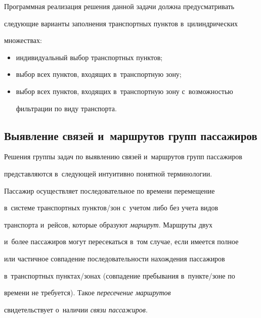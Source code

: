 Программная реализация решения данной задачи должна предусмат\-ри\-вать 


сле\-ду\-ющие варианты заполнения транспортных пунк\-тов в~ци\-линд\-ри\-че\-ских 


множествах:


\begin{itemize}


\item индивидуальный выбор транспортных пунктов;


\item выбор всех пунктов, входящих в~транспортную зону;


\item выбор всех пунктов, входящих в~транспортную зону с~воз\-мож\-ностью 


фильт\-ра\-ции по виду транспорта.


\end{itemize}





\subsection{Выявление связей и~маршрутов групп пассажиров} %





Решения группы задач по выявлению связей и~маршрутов групп пассажиров 


представляются в~сле\-ду\-ющей интуитивно понятной терминологии. 


Пассажир осуществляет последовательное по времени перемещение 


в~системе транспортных пунк\-тов\!/\!зон с~учетом либо без учета видов 


транспорта и~рейсов, которые образуют \textit{маршрут}. Маршруты двух 


и~более пассажиров могут пересекаться в~том случае, если имеется полное 


или час\-тич\-ное совпадение по\-сле\-до\-ва\-тель\-ности на\-хож\-де\-ния пассажиров 


в~транспортных пунк\-тах\!/\!зо\-нах (совпадение пребывания в~пунк\-те\!/\!зо\-не по 


времени не требуется). Такое \textit{пересечение маршрутов} 


свидетельствует о~наличии \textit{связи пассажиров}.





